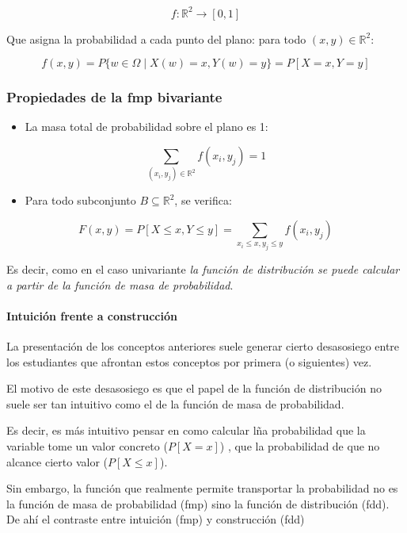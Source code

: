 \documentclass[
]{article}
\providecommand{\tightlist}{%
  \setlength{\itemsep}{0pt}\setlength{\parskip}{0pt}}
\begin{document}
\[
f: \mathbb{R}^2 \to [0, 1]
\]

Que asigna la probabilidad a cada punto del plano: para todo \((x, y) \in \mathbb{R}^{2}\):

\[
f(x, y) = P\{w \in \Omega \mid X(w) = x, Y(w) = y\} = P[X = x, Y = y]
\]

\subsubsection{Propiedades de la fmp bivariante}\label{propiedades-de-la-fmp-bivariante}

\begin{itemize}
\tightlist
\item
  La masa total de probabilidad sobre el plano es 1:
\end{itemize}

\[
\sum_{(x_i, y_j) \in \mathbb{R}^{2}} f(x_i, y_j) = 1
\]

\begin{itemize}
\tightlist
\item
  Para todo subconjunto \(B \subseteq \mathbb{R}^2\), se verifica:
\end{itemize}

\[
F(x, y) = P[X \leq x, Y \leq y] = \sum_{x_i \leq x, y_j \leq y} f(x_i, y_j)
\]

Es decir, como en el caso univariante \emph{la función de distribución se puede calcular a partir de la función de masa de probabilidad}.

\paragraph{Intuición frente a construcción}\label{intuiciuxf3n-frente-a-construcciuxf3n}

La presentación de los conceptos anteriores suele generar cierto desasosiego entre los estudiantes que afrontan estos conceptos por primera (o siguientes) vez.

El motivo de este desasosiego es que el papel de la función de distribución no suele ser tan intuitivo como el de la función de masa de probabilidad.

Es decir, es más intuitivo pensar en como calcular lña probabilidad que la variable tome un valor concreto (\(P[X=x]\)) , que la probabilidad de que no alcance cierto valor (\(P[X\leq x]\)).

Sin embargo, la función que realmente permite transportar la probabilidad no es la función de masa de probabilidad (fmp) sino la función de distribución (fdd). De ahí el contraste entre intuición (fmp) y construcción (fdd)
\end{document}
